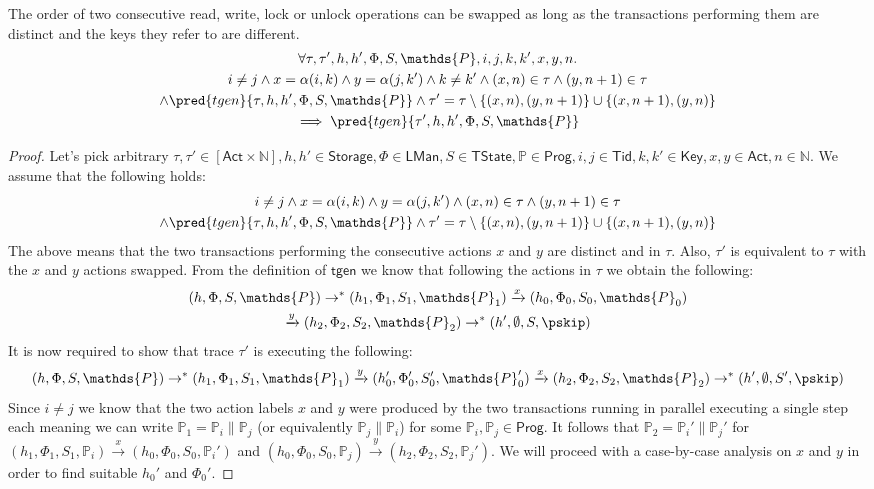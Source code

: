 \lem \label{lem:rwlu} The order of two consecutive read, write, lock or unlock operations can be swapped as long as the transactions performing them are distinct and the keys they refer to are different.
\begin{gather*}
	\forall \tau, \tau', h, h', \Phi, S, \mathds{P}, i, j, k, k', x, y, n \ldotp \\
		i \neq j \land x = \alpha(i, k) \land y = \alpha(j, k') \land k \neq k' \land (x, n) \in \tau \land (y, n+1) \in \tau \\ \land \pred{tgen}{\tau, h, h', \Phi, S, \mathds{P}} \land \tau' = \tau \setminus \{(x, n), (y, n+1)\} \cup \{ (x, n+1), (y, n) \}
		\\	 
	 \implies \pred{tgen}{\tau', h, h', \Phi, S, \mathds{P}}
\end{gather*}
\begin{proof}
Let's pick arbitrary $\tau, \tau' \in [\mathsf{Act} \times \mathds{N}], h, h' \in \mathsf{Storage}, \Phi \in \mathsf{LMan}, S \in \mathsf{TState}, \mathds{P} \in \mathsf{Prog}, i, j \in \mathsf{Tid}, k, k' \in \mathsf{Key}, x, y \in \mathsf{Act}, n \in \mathds{N}$. We assume that the following holds:
\begin{gather}
	i \neq j \land x = \alpha(i, k) \land y = \alpha(j, k') \land (x, n) \in \tau \land (y, n+1) \in \tau \\ \land \pred{tgen}{\tau, h, h', \Phi, S, \mathds{P}} \land \tau' = \tau \setminus \{(x, n), (y, n+1)\} \cup \{ (x, n+1), (y, n) \}
\end{gather}
The above means that the two transactions performing the consecutive actions $x$ and $y$ are distinct and in $\tau$. Also, $\tau'$ is equivalent to $\tau$ with the $x$ and $y$ actions swapped. From the definition of $\mathsf{tgen}$ we know that following the actions in $\tau$ we obtain the following:
\begin{gather}
	\label{lem:xy1} (h, \Phi, S, \mathds{P}) \rightarrow^* (h_1, \Phi_1, S_1, \mathds{P}_1) \xrightarrow{x} (h_0, \Phi_0, S_0, \mathds{P}_0) \\
	\label{lem:xy2} \xrightarrow{y} (h_2, \Phi_2, S_2, \mathds{P}_2) \rightarrow^* (h', \emptyset, S, \pskip)
\end{gather}
It is now required to show that trace $\tau'$ is executing the following:
\[
	(h, \Phi, S, \mathds{P}) \rightarrow^* (h_1, \Phi_1, S_1, \mathds{P}_1) \xrightarrow{y} (h_0', \Phi_0', S_0', \mathds{P}_0') \xrightarrow{x} (h_2, \Phi_2, S_2, \mathds{P}_2) \rightarrow^* (h', \emptyset, S', \pskip)
\]
Since $i \neq j$ we know that the two action labels $x$ and $y$ were produced by the two transactions running in parallel executing a single step each meaning we can write $\mathds{P}_1 = \mathds{P}_i \| \mathds{P}_j$ (or equivalently $\mathds{P}_j \| \mathds{P}_i$) for some $\mathds{P}_i, \mathds{P}_j \in \mathsf{Prog}$. It follows that $\mathds{P}_2 = \mathds{P}_i' \| \mathds{P}_j'$ for $(h_1, \Phi_1, S_1, \mathds{P}_i) \xrightarrow{x} (h_0, \Phi_0, S_0, \mathds{P}_i')$ and $(h_0, \Phi_0, S_0, \mathds{P}_j) \xrightarrow{y} (h_2, \Phi_2, S_2, \mathds{P}_j')$. We will proceed with a case-by-case analysis on $x$ and $y$ in order to find suitable $h_0'$ and $\Phi_0'$.

\end{proof}
